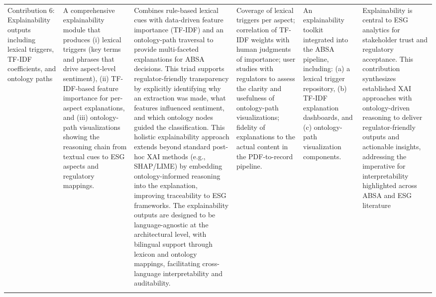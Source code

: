 \begin{landscape}
\begin{longtable}{p{2cm} p{3cm} p{6cm} p{3cm} p{3cm} p{6cm}}
Contribution 6: Explainability outputs including lexical triggers, TF-IDF coefficients, and ontology paths & A comprehensive explainability module that produces (i) lexical triggers (key terms and phrases that drive aspect-level sentiment), (ii) TF-IDF-based feature importance for per-aspect explanations, and (iii) ontology-path visualizations showing the reasoning chain from textual cues to ESG aspects and regulatory mappings. & Combines rule-based lexical cues with data-driven feature importance (TF-IDF) and an ontology-path traversal to provide multi-faceted explanations for ABSA decisions. This triad supports regulator-friendly transparency by explicitly identifying why an extraction was made, what features influenced sentiment, and which ontology nodes guided the classification. This holistic explainability approach extends beyond standard post-hoc XAI methods (e.g., SHAP/LIME) by embedding ontology-informed reasoning into the explanation, improving traceability to ESG frameworks. The explainability outputs are designed to be language-agnostic at the architectural level, with bilingual support through lexicon and ontology mappings, facilitating cross-language interpretability and auditability. & Coverage of lexical triggers per aspect; correlation of TF-IDF weights with human judgments of importance; user studies with regulators to assess the clarity and usefulness of ontology-path visualizations; fidelity of explanations to the actual content in the PDF-to-record pipeline. & An explainability toolkit integrated into the ABSA pipeline, including: (a) a lexical trigger repository, (b) TF-IDF explanation dashboards, and (c) ontology-path visualization components. & Explainability is central to ESG analytics for stakeholder trust and regulatory acceptance. This contribution synthesizes established XAI approaches with ontology-driven reasoning to deliver regulator-friendly outputs and actionable insights, addressing the imperative for interpretability highlighted across ABSA and ESG literature \cite{10.1002/csr.70089,10.2139/ssrn.3738629,10.1108/mf-01-2023-0020,10.3390/math12193119,10.2139/ssrn.3796152,10.1371/journal.pone.0288052,10.1051/e3sconf/202343602004} \\
\addlinespace


\end{longtable}

\end{landscape}